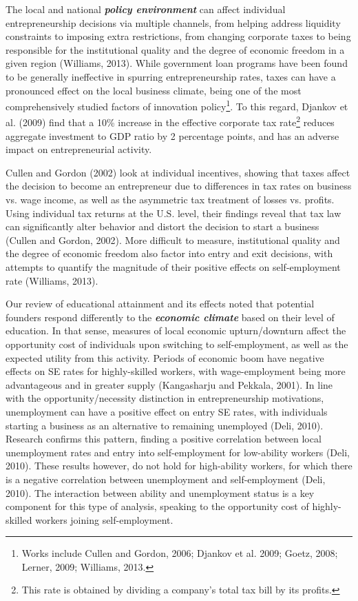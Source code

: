The local and national \textbf{\textit{policy environment}} can affect individual entrepreneurship decisions via multiple channels, from helping address liquidity constraints to imposing extra restrictions, from changing corporate taxes to being responsible for the institutional quality and the degree of economic freedom in a given region (Williams, 2013). While government loan programs have been found to be generally ineffective in spurring entrepreneurship rates, taxes can have a pronounced effect on the local business climate, being one of the most comprehensively studied factors of innovation policy\footnote{Works include Cullen and Gordon, 2006; Djankov et al. 2009; Goetz, 2008; Lerner, 2009; Williams, 2013.}. To this regard, Djankov et al. (2009) find that a 10\% increase in the effective corporate tax rate\footnote{ This rate is obtained by dividing a company’s total tax bill by its profits.} reduces aggregate investment to GDP ratio by 2 percentage points, and has an adverse impact on entrepreneurial activity. 

Cullen and Gordon (2002) look at individual incentives, showing that taxes affect the decision to become an entrepreneur due to differences in tax rates on business vs. wage income, as well as the asymmetric tax treatment of losses vs. profits. Using individual tax returns at the U.S. level, their findings reveal that tax law can significantly alter behavior and distort the decision to start a business (Cullen and Gordon, 2002). More difficult to measure, institutional quality and the degree of economic freedom also factor into entry and exit decisions, with attempts to quantify the magnitude of their positive effects on self-employment rate (Williams, 2013).

Our review of educational attainment and its effects noted that potential founders respond differently to the \textbf{\textit{economic climate}} based on their level of education. In that sense, measures of local economic upturn/downturn affect the opportunity cost of individuals upon switching to self-employment, as well as the expected utility from this activity. Periods of economic boom have negative effects on SE rates for highly-skilled workers, with wage-employment being more advantageous and in greater supply (Kangasharju and Pekkala, 2001). In line with the opportunity/necessity distinction in entrepreneurship motivations, unemployment can have a positive effect on entry SE rates, with individuals starting a business as an alternative to remaining unemployed (Deli, 2010). Research confirms this pattern, finding a positive correlation between local unemployment rates and entry into self-employment for low-ability workers (Deli, 2010). These results however, do not hold for high-ability workers, for which there is a negative correlation between unemployment and self-employment (Deli, 2010). The interaction between ability and unemployment status is a key component for this type of analysis, speaking to the opportunity cost of highly-skilled workers joining self-employment. 













